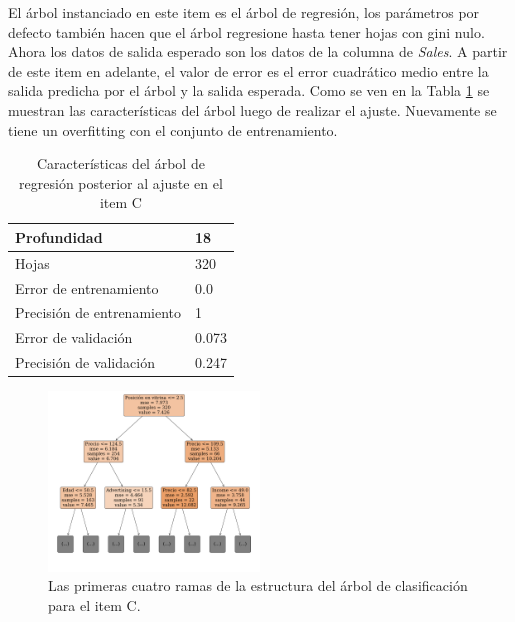 El árbol instanciado en este item es el árbol de regresión, los parámetros por defecto también hacen que el árbol regresione hasta tener hojas con gini nulo. Ahora los datos de salida esperado son los datos de la columna de \emph{Sales}. A partir de este item en adelante, el valor de error es el error cuadrático medio entre la salida predicha por el árbol y la salida esperada. Como se ven en la Tabla \ref{tab:item_C} se muestran las características del árbol luego de realizar el ajuste. Nuevamente se tiene un overfitting con el conjunto de entrenamiento. 
\begin{table}[H]
	\begin{small}
		\begin{center}
			\begin{tabular}[c]{l|l}
				Profundidad & 18 \\ \hline
				Hojas & 320 \\ \hline
				Error de entrenamiento & 0.0\\ \hline
				Precisión de entrenamiento & 1 \\ \hline
				Error de validación & 0.073\\ \hline
				Precisión de validación & 0.247 \\ 
			\end{tabular}
		\end{center}
	\end{small}
	\caption{Características del árbol de regresión posterior al ajuste en el item C}
	\label{tab:item_C}
\end{table}
\begin{figure}[H]
	\begin{small}
		\begin{center}
			\includegraphics[clip,trim=0 3.8cm {.5\wd0} 0, width=0.5\textwidth]{figures/tree_C_tree.pdf}
		\end{center}
		\caption{Las primeras cuatro ramas de la estructura del árbol de clasificación para el item C.}
		\label{fig:item_C_tree}
	\end{small}
\end{figure}

